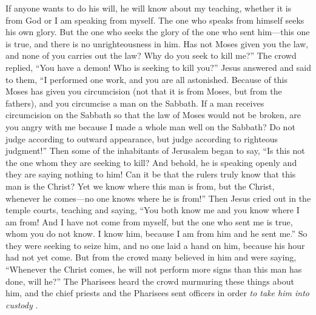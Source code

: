 \begin{biblechapter}
\verse If anyone wants to do his will, he will know about my teaching, whether it is from God or I am speaking from myself.
\verse The one who speaks from himself seeks his own glory. But the one who seeks the glory of the one who sent him—this one is true, and there is no unrighteousness in him.
\verse Has not Moses given you the law, and none of you carries out the law? Why do you seek to kill me?”
\verse The crowd replied, “You have a demon! Who is seeking to kill you?”
\verse Jesus answered and said to them, “I performed one work, and you are all astonished.
\verse Because of this Moses has given you circumcision (not that it is from Moses, but from the fathers), and you circumcise a man on the Sabbath.
\verse If a man receives circumcision on the Sabbath so that the law of Moses would not be broken, are you angry with me because I made a whole man well on the Sabbath?
\verse Do not judge according to outward appearance, but judge according to righteous judgment!”
 Then some of the inhabitants of Jerusalem began to say, “Is this not the one whom they are seeking to kill?
\verse And behold, he is speaking openly and they are saying nothing to him! Can it be that the rulers truly know that this man is the Christ?
\verse Yet we know where this man is from, but the Christ, whenever he comes—no one knows where he is from!”
\verse Then Jesus cried out in the temple courts, teaching and saying, “You both know me and you know where I am from! And I have not come from myself, but the one who sent me is true, whom you do not know.
\verse I know him, because I am from him and he sent me.”
\verse So they were seeking to seize him, and no one laid a hand on him, because his hour had not yet come.
\verse But from the crowd many believed in him and were saying, “Whenever the Christ comes, he will not perform more signs than this man has done, will he?”
\verse The Pharisees heard the crowd murmuring these things about him, and the chief priests and the Pharisees sent officers in order \textit{to take him into custody }.

\end{biblechapter}
